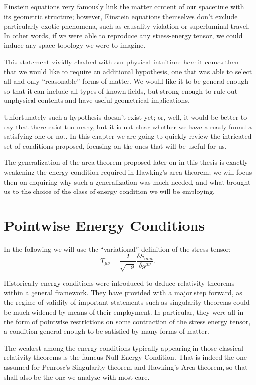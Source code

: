 Einstein equations very famously link the matter content of our spacetime with its geometric structure; however, Einstein equations themselves don't exclude particularly exotic phenomena, such as causality violation or superluminal travel. In other words, if we were able to reproduce any stress-energy tensor, we could induce any space topology we were to imagine.

This statement vividly clashed with our physical intuition: here it comes then that we would like to require an additional hypothesis, one that was able to select all and only ``reasonable'' forms of matter. We would like it to be general enough so that it can include all types of known fields, but strong enough to rule out unphysical contents and have useful geometrical implications.

Unfortunately such a hypothesis doesn't exist yet; or, well, it would be better to say that there exist too many, but it is not clear whether we have already found a satisfying one or not. In this chapter we are going to quickly review the intricated set of conditions proposed, focusing on the ones that will be useful for us. 

The generalization of the area theorem proposed later on in this thesis is exactly weakening the energy condition required in Hawking's area theorem; we will focus then on enquiring why such a generalization was much needed, and what brought us to the choice of the class of energy condition we will be employing.

\section{Pointwise Energy Conditions}
\label{sec:pointwise-energy-conditions}

In the following we will use the ``variational'' definition of the stress tensor:
\[
   T_{\mu\nu} = \frac{2}{\sqrt{-g}} \frac{\delta S_{mat}}{\delta g^{\mu\nu}}. 
\]

Historically energy conditions were introduced to deduce relativity theorems within a general framework. They have provided with a major step forward, as the regime of validity of important statements such as singularity theorems could be much widened by means of their employment. 
In particular, they were all in the form of pointwise restrictions on some contraction of the stress energy tensor, a condition general enough to be satisfied by many forms of matter.

The weakest among the energy conditions typically appearing in those classical relativity theorems is the famous Null Energy Condition. That is indeed the one assumed for Penrose's Singularity theorem and Hawking's Area theorem, so that shall also be the one we analyze with most care.

